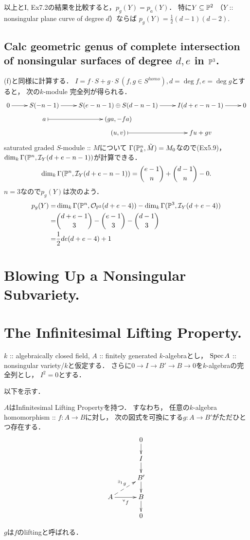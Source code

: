 \documentclass[a4paper]{jsarticle}
\begin{document}
    以上とI, Ex7.2の結果を比較すると，$p_g(Y)=p_a(Y)$．
    特に$Y \subseteq \mathbb{P}^2$
    （$Y$ :: nonsingular plane curve of degree $d$）ならば
    $p_g(Y)=\frac{1}{2}(d-1)(d-2)$.

    \subsection{Calc geometric genus of 
        complete intersection of nonsingular surfaces of degree $d,e$ in $\mathbb{P}^3$.}
    (f)と同様に計算する．
    $I=f \cdot S+g \cdot S \ (f,g \in S^{homo}), d=\deg f, e=\deg g$とすると，
    次の$k$-module 完全列が得られる．
    \[
    \xymatrix@R=5pt
    {
        0 \ar[r]
        & S(-n-1) \ar[r]
        & S(e-n-1) \oplus S(d-n-1) \ar[r]
        & I(d+e-n-1) \ar[r]
        & 0 \\
        {} & a \ar@{|->}[r]& (ga, -fa) & {} & {} \\
        {} & {} & (u, v) \ar@{|->}[r]& fu+gv & {}
    }
    \]
    saturated graded $S$-module :: $M$について
    $\Gamma(\mathbb{P}^n_k,\tilde{M})=M_0$なので(Ex5.9)，
    $\dim_k \Gamma(\mathbb{P}^n, \mathcal{I}_Y(d+e-n-1))$が計算できる．
    \[
        \dim_k \Gamma(\mathbb{P}^n, \mathcal{I}_Y(d+e-n-1))
        =\binom{e-1}{n}+\binom{d-1}{n}-0.
    \]
    $n=3$なので$p_g(Y)$は次のよう．
    \begin{align*}
        p_g(Y)
        =&\dim_k \Gamma(\mathbb{P}^n, \mathcal{O}_{\mathbb{P}^3}(d+e-4))-\dim_k \Gamma(\mathbb{P}^3, \mathcal{I}_Y(d+e-4)) \\
        =&\binom{d+e-1}{3}-\binom{e-1}{3}-\binom{d-1}{3} \\
        =&\frac{1}{2}de(d+e-4)+1
    \end{align*}

\section{Blowing Up a Nonsingular Subvariety.} %

\section{The Infinitesimal Lifting Property.} %
    $k$ :: algebraically closed field,
    $A$ :: finitely generated $k$-algebraとし，
    $\operatorname{Spec} A$ :: nonsingular variety/$k$と仮定する．
    さらに$0 \to I \to B' \to B \to 0$を$k$-algebraの完全列とし，
    $I^2=0$とする．

    以下を示す．
    \begin{Thm}
        $A$はInfinitesimal Lifting Propertyを持つ．
        すなわち，
        任意の$k$-algebra homomorphism :: $f: A \to B$に対し，
        次の図式を可換にする$g: A \to B'$がただひとつ存在する．
        \[
        \xymatrix@R=15pt@C=30pt
        {
            {} & 0 \ar[d]\\
            {} & I \ar[d]\\
            {} & B'\ar[d]\\
            A \ar[r]_-{{}^{\forall} f} \ar@{-->}[ru]^{{}^{\exists_1} g}& B \ar[d]\\
            {} & 0 \\
        }
        \]
    \end{Thm}
    $g$は$f$のliftingと呼ばれる．
    
\end{document}

